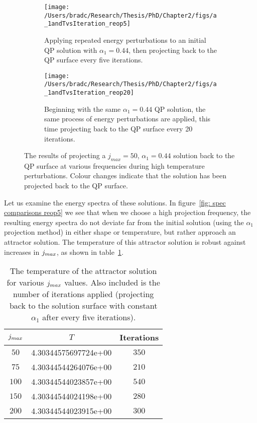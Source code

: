 \documentclass[../PhD.tex]{subfiles}
\begin{document}
\begin{figure}[ht]
	\centering
	\begin{subfigure}[t]{0.47\textwidth}
		\texttt{[image: /Users/bradc/Research/Thesis/PhD/Chapter2/figs/a\_1andTvsIteration\_reop5]}
		\caption{Applying repeated energy perturbations to an initial QP solution with $\alpha_1=0.44$, then projecting back to the QP surface every five iterations.}
		\label{fig: a_1andTa0.2reop5}
	\end{subfigure}
	\hfill
	\begin{subfigure}[t]{0.47\textwidth}
		\texttt{[image: /Users/bradc/Research/Thesis/PhD/Chapter2/figs/a\_1andTvsIteration\_reop20]}
		\caption{Beginning with the same $\alpha_1 = 0.44$ QP solution, the same process of energy perturbations are applied, this time projecting back to the QP surface every 20 iterations.}
		\label{fig: a_1andTa.2reop20}
	\end{subfigure}
	\caption[High temperature solutions resulting from projecting back to the QP solution surface at various frequencies]{The results of projecting a $j_{max}=50$, $\alpha_1 = 0.44$ solution back to the QP surface at various frequencies during high temperature perturbations. Colour changes indicate that the solution has been projected back to the QP surface.}
	\label{fig: reop comparisons}
\end{figure}

Let us examine the energy spectra of these solutions. In figure~\ref{fig: spec comparisons reop5} we see that when we choose a high projection frequency, the resulting energy spectra do not deviate far from the initial solution (using the $\alpha_1$ projection method) in either shape or temperature, but rather approach an attractor solution. The temperature of this attractor solution is robust against increases in $j_{max}$, as shown in table~\ref{tab: T_thresh}.

\begin{table}[h]
	\centering
	\begin{tabular}[t]{|c|c|c|}
		\hline
		$j_{max}$ & $T$ & Iterations \\ \hline
		$50$ & 4.30344575697724e+00 & $350$ \\ \hline
		$75$ & 4.30344544264076e+00 & $210$ \\ \hline
		$100$ & 4.30344544023857e+00 & $540$ \\ \hline
		$150$ & 4.30344544024198e+00 & $280$ \\ \hline
		$200$ & 4.30344544023915e+00 & $300$ \\ \hline
	\end{tabular}
	\caption[Attractor solution temperature for different truncation values with constant projection frequency]{The temperature of the attractor solution for various $j_{max}$ values. Also included is the number of iterations applied (projecting back to the solution surface with constant $\alpha_1$ after every five iterations).}
	\label{tab: T_thresh}
\end{table}
\end{document}

